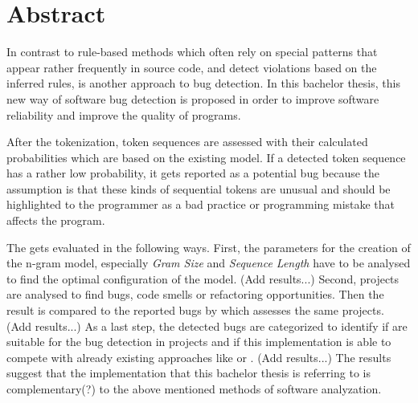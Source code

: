 \chapter*{Abstract}

In contrast to rule-based methods which often rely on special patterns that appear rather frequently in source code, and detect violations based on the inferred rules, \ngram{} is another approach to bug detection. In this bachelor thesis, this new way of software bug detection is proposed in order to improve software reliability and improve the quality of \scratch{} programs.

After the tokenization, token sequences are assessed with their calculated probabilities which are based on the existing model. If a detected token sequence has a rather low probability, it gets reported as a potential bug because the assumption is that these kinds of sequential tokens are unusual and should be highlighted to the programmer as a bad practice or programming mistake that affects the program.

The \ngram{} gets evaluated in the following ways. First, the parameters for the creation of the n-gram model, especially \emph{Gram Size} and \emph{Sequence Length} have to be analysed to find the optimal configuration of the model. (Add results...) Second, \scratch{} projects are analysed to find bugs, code smells or refactoring opportunities. Then the result is compared to the reported bugs by \litterbox{} which assesses the same projects. (Add results...) As a last step, the detected bugs are categorized to identify if  are suitable for the bug detection in \scratch{} projects and if this implementation is able to compete with already existing approaches like \litterbox{} or \bugram{}. (Add results...) The results suggest that the implementation that this bachelor thesis is referring to is complementary(?) to the above mentioned methods of software analyzation.
 